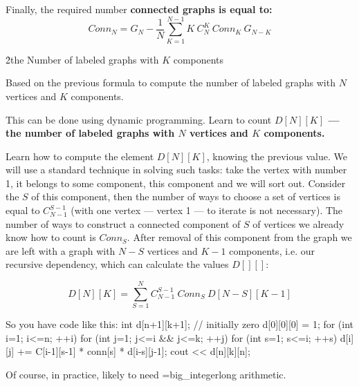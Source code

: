 Finally, the required number \bf{connected} graphs is equal to:
$$ Conn_N = G_N - \frac{1}{N} \sum_{K=1}^{N-1} K\ C_N^K\ Conn_K\ G_{N-K} $$

\h2{the Number of labeled graphs with $K$ components}

Based on the previous formula to compute the number of labeled graphs with $N$ vertices and $K$ components.

This can be done using dynamic programming. Learn to count \bf{$D[N][K]$} --- the number of labeled graphs with $N$ vertices and $K$ components.

Learn how to compute the element $D[N][K]$, knowing the previous value. We will use a standard technique in solving such tasks: take the vertex with number 1, it belongs to some component, this component and we will sort out. Consider the $S$ of this component, then the number of ways to choose a set of vertices is equal to $C_{N-1}^{S-1}$ (with one vertex --- vertex 1 --- to iterate is not necessary). The number of ways to construct a connected component of $S$ of vertices we already know how to count is $Conn_S$. After removal of this component from the graph we are left with a graph with $N-S$ vertices and $K-1$ components, i.e. our recursive dependency, which can calculate the values $D[][]$:

$$ D[N][K] = \sum_{S=1}^{N} C_{N-1}^{S-1}\ Conn_S\ D[N-S][K-1] $$

So you have code like this:
\code
int d[n+1][k+1]; // initially zero
d[0][0][0] = 1;
for (int i=1; i<=n; ++i)
for (int j=1; j<=i && j<=k; ++j)
for (int s=1; s<=i; ++s)
d[i][j] += C[i-1][s-1] * conn[s] * d[i-s][j-1];
cout << d[n][k][n];
\endcode

Of course, in practice, likely to need \algohref=big_integer{long arithmetic}.